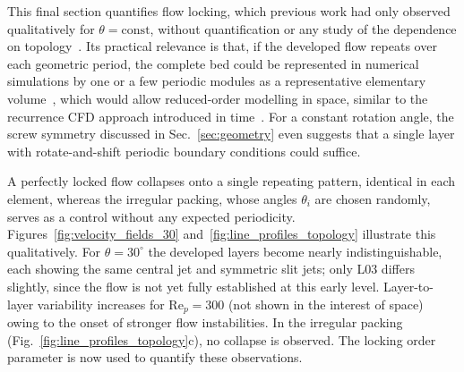 This final section quantifies flow locking, which previous work had only observed qualitatively for $\theta=\mathrm{const}$, without quantification or any study of the dependence on topology~\cite{velten2026}. Its practical relevance is that, if the developed flow repeats over each geometric period, the complete bed could be represented in numerical simulations by one or a few periodic modules as a representative elementary volume~\cite{ou2024parameter,patankar1977periodic}, which would allow reduced-order modelling in space, similar to the recurrence CFD approach introduced in time~\cite{lichtenegger2016recurrence}. For a constant rotation angle, the screw symmetry discussed in Sec.~\ref{sec:geometry} even suggests that a single layer with rotate-and-shift periodic boundary conditions could suffice.

A perfectly locked flow collapses onto a single repeating pattern, identical in each element, whereas the irregular packing, whose angles $\theta_i$ are chosen randomly, serves as a control without any expected periodicity. Figures~\ref{fig:velocity_fields_30} and~\ref{fig:line_profiles_topology} illustrate this qualitatively. For $\theta=30^\circ$ the developed layers become nearly indistinguishable, each showing the same central jet and symmetric slit jets; only L03 differs slightly, since the flow is not yet fully established at this early level. Layer-to-layer variability increases for Re$_p=300$ (not shown in the interest of space) owing to the onset of stronger flow instabilities. In the irregular packing (Fig.~\ref{fig:line_profiles_topology}c), no collapse is observed. The locking order parameter is now used to quantify these observations.

